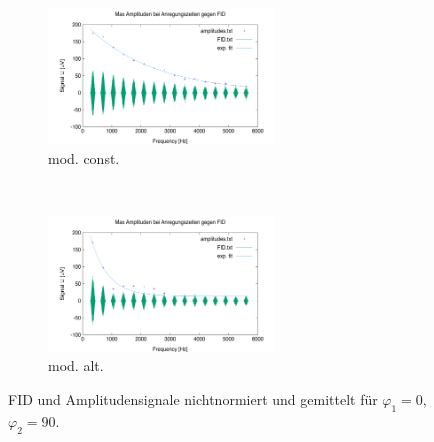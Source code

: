 \documentclass{article}
\begin{document}
        \begin{figure}[H]
            \centering
            \begin{subfigure}[b]{0.4\textwidth}
                \centering
                \includegraphics[width=6cm]{../Bilddateien/10/CPMG-0-90-constant-avg.png}
                \caption{mod. const.}
                \label{fig:CPMG-0-90-constant-avg}
            \end{subfigure}
            \
            \begin{subfigure}[b]{0.4\textwidth}
                \centering
                \includegraphics[width=6cm]{../Bilddateien/10/CPMG-0-90-alternating-avg.png}
                \caption{mod. alt.}
                \label{fig:CPMG-0-90-alternating-avg}
            \end{subfigure}
            \caption{FID und Amplitudensignale nichtnormiert und gemittelt für $\varphi_1 = 0$, $\varphi_2 = 90$.}
            \label{fig:CPMG-0-90-avg}
        \end{figure}
        
\end{document}
